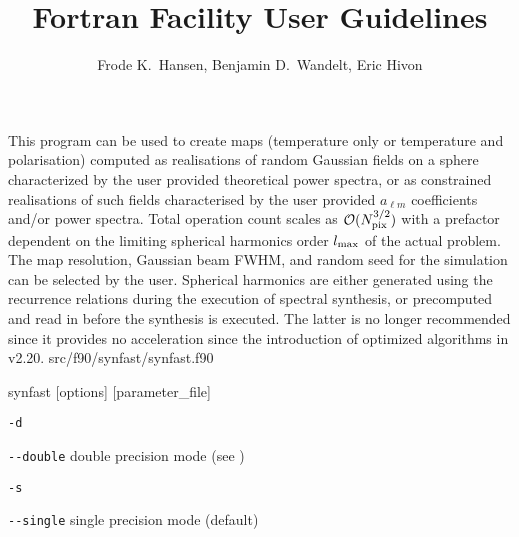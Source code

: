
\sloppy


\title{\healpix Fortran Facility User Guidelines}
 \section[synfast]{\nosectionname}
\label{fac:synfast}
\author{Frode K.~Hansen, Benjamin D.~Wandelt, Eric Hivon}

\begin{facility}
{This program can be used to create  \healpix maps (temperature only
or temperature and polarisation)  computed as realisations 
of random Gaussian
fields on a sphere characterized by the user provided 
theoretical power spectra,
or as constrained realisations of such fields characterised by the user
provided $a_{\ell m}$ coefficients and/or power spectra.
Total operation count scales as
 ${\cal {O}}(N_\textrm{pix}^{3/2})$ with a prefactor dependent on the limiting spherical harmonics
order $l_{\textrm{max}}$ of the actual problem. 
The map resolution, Gaussian beam FWHM,  
and random seed for the simulation can be selected by the user.
Spherical harmonics are either generated using the recurrence relations
during the execution of spectral synthesis, or  precomputed and read in
before the synthesis is executed. The latter is no longer recommended since
it provides no acceleration since the introduction of optimized algorithms
in \healpix v2.20. }
{src/f90/synfast/synfast.f90}
\end{facility}

\begin{f90facility}
{synfast [options] [parameter\_file]}
\end{f90facility}

\begin{options}
  \begin{optionlistwide}{} %
    \item[{\tt -d}]
    \item[{\tt -}{\tt -}{\tt double}] double precision mode (see 
)
    \item[{\tt -s}]
    \item[{\tt -}{\tt -}{\tt single}] single precision mode (default)
  \end{optionlistwide}
\end{options}

